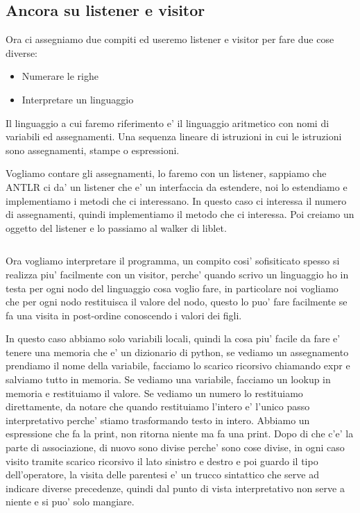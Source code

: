 \subsection{Ancora su listener e visitor}
Ora ci assegniamo due compiti ed useremo listener e visitor per fare due cose diverse:
\begin{itemize}
    \item Numerare le righe
    \item Interpretare un linguaggio
\end{itemize}

Il linguaggio a cui faremo riferimento e' il linguaggio aritmetico con nomi di variabili ed assegnamenti. Una sequenza lineare di istruzioni in cui le istruzioni sono assegnamenti, stampe o espressioni.


Vogliamo contare gli assegnamenti, lo faremo con un listener, sappiamo che ANTLR ci da' un listener che e' un interfaccia da estendere, noi lo estendiamo e implementiamo i metodi che ci interessano. In questo caso ci interessa il numero di assegnamenti, quindi implementiamo il metodo che ci interessa. Poi creiamo un oggetto del listener e lo passiamo al walker di liblet.

\begin{lstlisting}

\end{lstlisting}

Ora vogliamo interpretare il programma, un compito cosi' sofisiticato spesso si realizza piu' facilmente con un visitor, perche' quando scrivo un linguaggio ho in testa per ogni nodo del linguaggio cosa voglio fare, in particolare noi vogliamo che per ogni nodo restituisca il valore del nodo, questo lo puo' fare facilmente se fa una visita in post-ordine conoscendo i valori dei figli.

In questo caso abbiamo solo variabili locali, quindi la cosa piu' facile da fare e' tenere una memoria che e' un dizionario di python, se vediamo un assegnamento prendiamo il nome della variabile, facciamo lo scarico ricorsivo chiamando expr e salviamo tutto in memoria. Se vediamo una variabile, facciamo un lookup in memoria e restituiamo il valore. Se vediamo un numero lo restituiamo direttamente, da notare che quando restituiamo l'intero e' l'unico passo interpretativo perche' stiamo trasformando testo in intero. Abbiamo un espressione che fa la print, non ritorna niente ma fa una print. Dopo di che c'e' la parte di associazione, di nuovo sono divise perche' sono cose divise, in ogni caso visito tramite scarico ricorsivo il lato sinistro e destro e poi guardo il tipo dell'operatore, la visita delle parentesi e' un trucco sintattico che serve ad indicare diverse precedenze, quindi dal punto di vista interpretativo non serve a niente e si puo' solo mangiare.
\begin{lstlisting}

\end{lstlisting}

